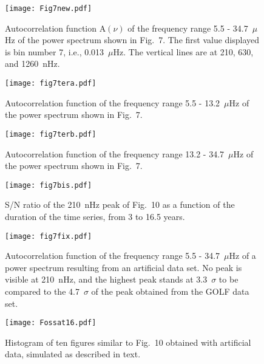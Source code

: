 \documentclass[bibyear]{aa}
\begin{document}
\begin{figure}
\centering
\texttt{[image: Fig7new.pdf]}
\caption{Autocorrelation function $\mathrm{A}(\nu)$ of the frequency range 5.5 - 34.7~$\mu$Hz of the power spectrum shown in  Fig.~7.  The first value displayed is bin number 7, i.e., 0.013~$\mu$Hz. The vertical lines are at 210, 630, and 1260~nHz.}
\label{fig:A}
\end{figure} 





\begin{figure}
\centering
\texttt{[image: fig7tera.pdf]}
\caption{Autocorrelation function of the frequency range 5.5 - 13.2~$\mu$Hz of the power spectrum shown in  Fig.~7. }
\label{fig:A_5-13}
\end{figure} 





\begin{figure}
\centering
\texttt{[image: fig7terb.pdf]}
\caption{Autocorrelation function of the frequency range 13.2 - 34.7~$\mu$Hz of the power spectrum shown in  Fig.~7. }
\label{fig:A_13-34}
\end{figure} 

\begin{figure}
\centering
\texttt{[image: fig7bis.pdf]}
\caption{S/N ratio of the 210~nHz peak of Fig.~10 as a function of the duration of the time series, from 3 to 16.5 years.}
\label{fig:SN_210peak}
\end{figure} 



\begin{figure}
\centering
\texttt{[image: fig7fix.pdf]}
\caption{Autocorrelation function of the frequency range 5.5 - 34.7~$\mu$Hz of a power spectrum resulting from an artificial data set. No peak is visible at 210~nHz, and the highest peak stands at 3.3~$\sigma$ to be compared to the 4.7~$\sigma$ of the peak obtained from the GOLF data set.}
\label{fig:A_simu}
\end{figure} 

\begin{figure}
\centering
\texttt{[image: Fossat16.pdf]}
\caption{Histogram of ten figures similar to Fig.~10 obtained with artificial data, simulated as described in text.}
\label{fig:histo}
\end{figure} 
\end{document}
